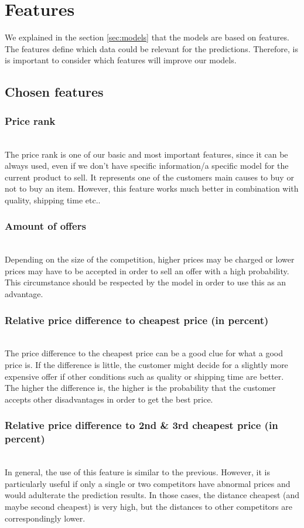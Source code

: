 \section{Features}
\label{sec:features}

	We explained in the section \ref{sec:models} that the models are based on features. The features define which data could be relevant for the predictions. Therefore, is is important to consider which features will improve our models.
\subsection{Chosen features}
	\subsubsection{Price rank}
	\label{sec:pricerank}
		~\\
		The price rank is one of our basic and most important features, since it can be always used, even if we don't have specific information/a specific model for the current product to sell. It represents one of the customers main causes to buy or not to buy an item. However, this feature works much better in combination with quality, shipping time etc..
	\subsubsection{Amount of offers}
		~\\
		Depending on the size of the competition, higher prices may be charged or lower prices may have to be accepted in order to sell an offer with a high probability. This circumstance should be respected by the model in order to use this as an advantage.
	\subsubsection{Relative price difference to cheapest price (in percent)}
		~\\
		The price difference to the cheapest price can be a good clue for what a good price is. If the difference is little, the customer might decide for a slightly more expensive offer if other conditions such as quality or shipping time are better. The higher the difference is, the higher is the probability that the customer accepts other disadvantages in order to get the best price.
	\subsubsection{Relative price difference to 2nd \& 3rd cheapest price (in percent)}
    \label{sec:pricediff3}
        ~\\
		In general, the use of this feature is similar to the previous. However, it is particularly useful if only a single or two competitors have abnormal prices and would adulterate the prediction results. In those cases, the distance cheapest (and maybe second cheapest) is very high, but the distances to other competitors are correspondingly lower.
